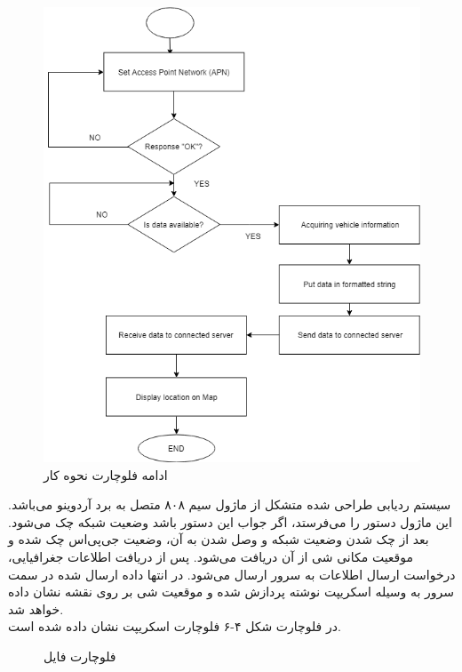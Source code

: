 \begin{figure}[!h]
	\centerline{\includegraphics[width=.9\textwidth]{continue-gsm}}
	\caption{ادامه فلوچارت نحوه کار  \cite{ElShafee2013}}
\end{figure}


سیستم ردیابی طراحی شده متشکل از ماژول سیم ۸۰۸ متصل به برد آردوینو می‌باشد. این ماژول دستور  را می‌فرستد، اگر جواب این دستور  باشد وضعیت شبکه چک می‌شود. بعد از چک شدن وضعیت شبکه و وصل شدن به آن، وضعیت جی‌پی‌اس چک شده و موقعیت مکانی شی از آن دریافت می‌شود. پس از دریافت اطلاعات جغرافیایی، درخواست ارسال اطلاعات به سرور ارسال می‌شود. در انتها داده ارسال شده در سمت سرور به وسیله اسکریپت نوشته پردازش شده و موقعیت شی بر روی نقشه نشان داده خواهد شد.
\\
در فلوچارت شکل ۴-۶ فلوچارت اسکریپت  نشان داده شده است.

\begin{figure}[h!]
	\caption{فلوچارت فایل   \cite{ElShafee2013}}
\end{figure}
